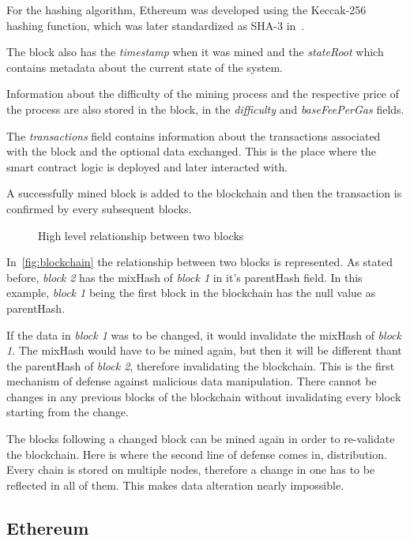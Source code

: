 \documentclass[a4paper,12pt]{report}
\begin{document}
For the hashing algorithm, Ethereum was developed using the Keccak-256 hashing
function, which was later standardized as SHA-3 in~\cite{sha3}.

The block also has the \textit{timestamp} when it was mined and the
\textit{stateRoot} which contains metadata about the current state of the
system.

Information about the difficulty of the mining process and the respective price
of the process are also stored in the block, in the \textit{difficulty} and
\textit{baseFeePerGas} fields.

The \textit{transactions} field contains information about the transactions
associated with the block and the optional data exchanged. This is the place
where the smart contract logic is deployed and later interacted with.

A successfully mined block is added to the blockchain and then the transaction
is confirmed by every subsequent blocks.

\begin{figure}[H]
    \centering
    \scalebox{1.1}{\footnotesize}
    \caption{High level relationship between two blocks}\label{fig:blockchain}
\end{figure}

In~\autoref{fig:blockchain} the relationship between two blocks is represented.
As stated before, \textit{block 2} has the mixHash of \textit{block 1} in it's
parentHash field. In this example, \textit{block 1} being the first block in
the blockchain has the null value as parentHash.

If the data in \textit{block 1} was to be changed, it would invalidate the
mixHash of \textit{block 1}. The mixHash would have to be mined again, but then
it will be different thant the parentHash of \textit{block 2}, therefore
invalidating the blockchain. This is the first mechanism of defense against
malicious data manipulation. There cannot be changes in any previous blocks of
the blockchain without invalidating every block starting from the change.

The blocks following a changed block can be mined again in order to re-validate
the blockchain. Here is where the second line of defense comes in,
distribution. Every chain is stored on multiple nodes, therefore a change in
one has to be reflected in all of them. This makes data alteration nearly
impossible.

\subsection{Ethereum}
\end{document}
